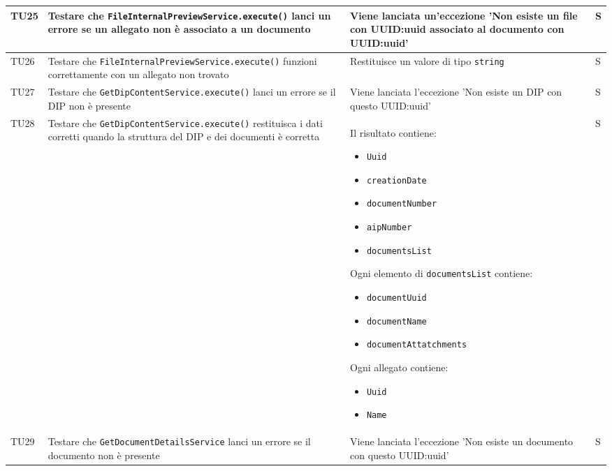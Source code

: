 \documentclass[a4paper,12pt]{article}
\begin{document}
\begin{longtable}{|M{1.2cm}|M{5cm}|M{7cm}|M{1.5cm}|}
            TU25 & Testare che \texttt{FileInternalPreviewService.execute()} lanci un errore se un allegato non è associato a un documento & Viene lanciata un'eccezione 'Non esiste un file con UUID:uuid associato al documento con UUID:uuid' & S \\
            \hline

            TU26 & Testare che \texttt{FileInternalPreviewService.execute()} funzioni correttamente con un allegato non trovato & Restituisce un valore di tipo \texttt{string} & S \\
            \hline

            TU27 & Testare che \texttt{GetDipContentService.execute()} lanci un errore se il DIP non è presente & Viene lanciata l'eccezione 'Non esiste un DIP con questo UUID:uuid' & S \\
            \hline

            TU28 & Testare che \texttt{GetDipContentService.execute()} restituisca i dati corretti quando la struttura del DIP e dei documenti è corretta & Il risultato contiene:
            \begin{itemize}[leftmargin=*]
                \item \texttt{Uuid}
                \item \texttt{creationDate}
                \item \texttt{documentNumber}
                \item \texttt{aipNumber}
                \item \texttt{documentsList}
            \end{itemize} Ogni elemento di \texttt{documentsList} contiene:
            \begin{itemize}[leftmargin=*]
                \item \texttt{documentUuid}
                \item \texttt{documentName}
                \item \texttt{documentAttatchments}
            \end{itemize} Ogni allegato contiene:
            \begin{itemize}[leftmargin=*]
                \item \texttt{Uuid}
                \item \texttt{Name}
            \end{itemize} & S \\
            \hline

            TU29 & Testare che \texttt{GetDocumentDetailsService} lanci un errore se il documento non è presente & Viene lanciata l'eccezione 'Non esiste un documento con questo UUID:uuid' & S \\
            \hline


\end{longtable}
\end{document}
